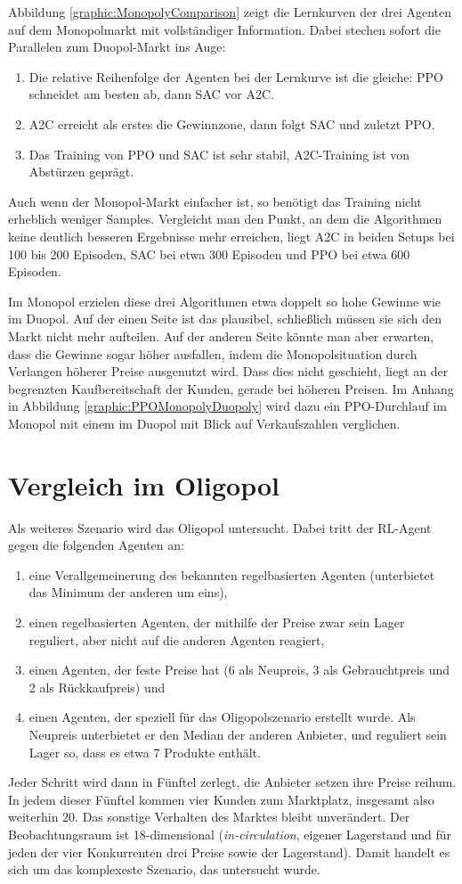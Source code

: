 Abbildung \ref{graphic:MonopolyComparison} zeigt die Lernkurven der drei Agenten auf dem Monopolmarkt mit vollständiger Information.
Dabei stechen sofort die Parallelen zum Duopol-Markt ins Auge:
\begin{enumerate}
	\item Die relative Reihenfolge der Agenten bei der Lernkurve ist die gleiche: PPO schneidet am besten ab, dann SAC vor A2C.
	\item A2C erreicht als erstes die Gewinnzone, dann folgt SAC und zuletzt PPO.
	\item Das Training von PPO und SAC ist sehr stabil, A2C-Training ist von Abstürzen geprägt.
\end{enumerate}
Auch wenn der Monopol-Markt einfacher ist, so benötigt das Training nicht erheblich weniger Samples.
Vergleicht man den Punkt, an dem die Algorithmen keine deutlich besseren Ergebnisse mehr erreichen, liegt A2C in beiden Setups bei 100 bis 200 Episoden, SAC bei etwa 300 Episoden und PPO bei etwa 600 Episoden.

Im Monopol erzielen diese drei Algorithmen etwa doppelt so hohe Gewinne wie im Duopol.
Auf der einen Seite ist das plausibel, schließlich müssen sie sich den Markt nicht mehr aufteilen.
Auf der anderen Seite könnte man aber erwarten, dass die Gewinne sogar höher ausfallen, indem die Monopolsituation durch Verlangen höherer Preise ausgenutzt wird.
Dass dies nicht geschieht, liegt an der begrenzten Kaufbereitschaft der Kunden, gerade bei höheren Preisen.
Im Anhang in Abbildung \ref{graphic:PPOMonopolyDuopoly} wird dazu ein PPO-Durchlauf im Monopol mit einem im Duopol mit Blick auf Verkaufszahlen verglichen.

\section{Vergleich im Oligopol}
Als weiteres Szenario wird das Oligopol untersucht.
Dabei tritt der RL-Agent gegen die folgenden Agenten an:
\begin{enumerate}
	\item eine Verallgemeinerung des bekannten regelbasierten Agenten (unterbietet das Minimum der anderen um eins),
	\item einen regelbasierten Agenten, der mithilfe der Preise zwar sein Lager reguliert, aber nicht auf die anderen Agenten reagiert,
	\item einen Agenten, der feste Preise hat (6 als Neupreis, 3 als Gebrauchtpreis und 2 als Rückkaufpreis) und
	\item einen Agenten, der speziell für das Oligopolszenario erstellt wurde.
	Als Neupreis unterbietet er den Median der anderen Anbieter, und reguliert sein Lager so, dass es etwa 7 Produkte enthält.
\end{enumerate}
Jeder Schritt wird dann in Fünftel zerlegt, die Anbieter setzen ihre Preise reihum.
In jedem dieser Fünftel kommen vier Kunden zum Marktplatz, insgesamt also weiterhin 20.
Das sonstige Verhalten des Marktes bleibt unverändert.
Der Beobachtungsraum ist 18-dimensional (\textit{in-circulation}, eigener Lagerstand und für jeden der vier Konkurrenten drei Preise sowie der Lagerstand).
Damit handelt es sich um das komplexeste Szenario, das untersucht wurde.

